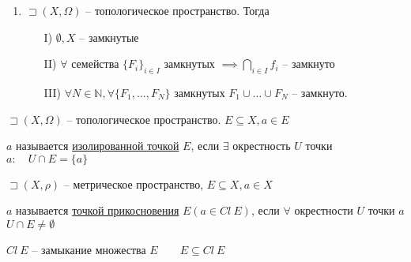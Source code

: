 \documentclass{book}
\newcommand\N{\ensuremath{\mathbb{N}}}
\renewcommand\O{\ensuremath{\emptyset}}
\theoremstyle{definition}
\begin{document}
\begin{corollary}
    \begin{enumerate}
        \item $\sqsupset (X, \Omega)$ -- топологическое пространство. Тогда
            \begin{enumerate}
                \item [I)] $\O , X$ -- замкнутые
                \item [II)] $\forall $ семейства $\{F_i\}_{i\in I}$ замкнутых  $\implies  \bigcap\limits_{i \in  I} f_i$ -- замкнуто
                \item [III)] $\forall N\in \N , \forall \{F_1, \ldots, F_N\}$ замкнутых $F_1\cup \ldots\cup  F_N$ -- замкнуто.
            \end{enumerate}
    \end{enumerate}
\end{corollary}

\begin{definition}
    $ \sqsupset (X, \Omega)$ -- топологическое пространство. $E\subseteq X, a\in E$

    $a$ называется \underline{изолированной точкой} $E$, если  $\exists $ окрестность $U$ точки  $a: \quad U\cap E = \{a\}$
\end{definition}

\begin{definition}
    $ \sqsupset (X, \rho)$ -- метрическое пространство, $E\subseteq X, a\in X$

    $a$ называется \underline{точкой прикосновения}  $E \left( a\in Cl ~E \right) $, если $\forall $ окрестности $U$ точки $a$  $U\cap E \neq \O $

    $Cl~E$ -- замыкание множества $E\qquad E\subseteq Cl~E$
\end{definition}
\end{document}
